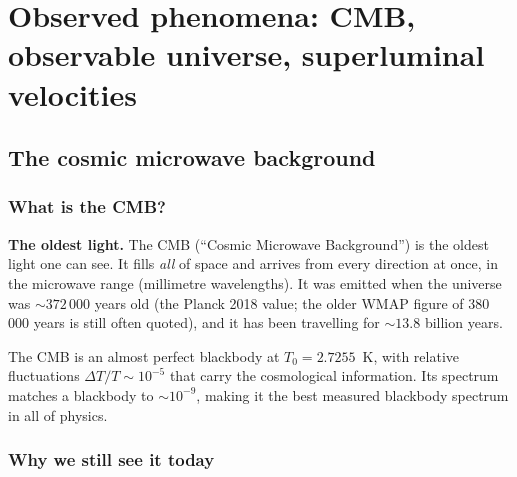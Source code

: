 \documentclass[11pt,a4paper,openany]{report}
\begin{document}
\clearpage

\part{Observed phenomena: CMB, observable universe, superluminal velocities}

\chapter{The cosmic microwave background}
\label{chap:cmb_observ}

\section{What is the CMB?}

\begin{tcolorbox}[plain]
\textbf{The oldest light.} The CMB (“Cosmic Microwave Background”) is the
oldest light one can see. It fills \emph{all} of space and arrives from every
direction at once, in the microwave range (millimetre wavelengths). It was
emitted when the universe was $\sim 372\,000$ years old (the Planck 2018 value;
the older WMAP figure of 380 000 years is still often quoted), and it has been
travelling for $\sim 13.8$ billion years.
\end{tcolorbox}

\begin{tcolorbox}[undergrad]
The CMB is an almost perfect blackbody at $T_{0} = 2.7255$~K, with relative
fluctuations $\Delta T/T \sim 10^{-5}$ that carry the cosmological information.
Its spectrum matches a blackbody to $\sim 10^{-9}$, making it the best measured
blackbody spectrum in all of physics.
\end{tcolorbox}

\section{Why we still see it today}
\end{document}
